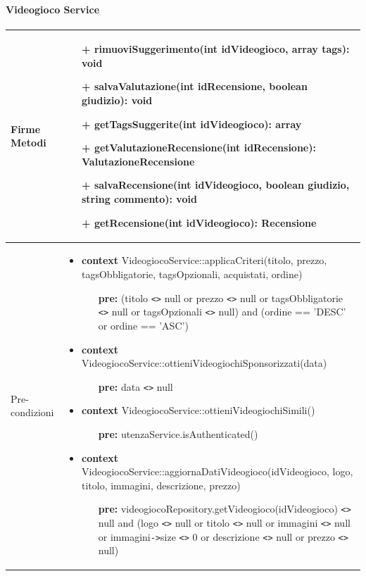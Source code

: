 \paragraph{Videogioco Service}
\small\begin{tabular}{|| l | p{28em} ||} 
	\hline
	Firme Metodi & \begin{itemize}
		\item[+] rimuoviSuggerimento(int idVideogioco, array tags): void
		\item[+] salvaValutazione(int idRecensione, boolean giudizio): void
		\item[+] getTagsSuggerite(int idVideogioco): array
		\item[+] getValutazioneRecensione(int idRecensione): ValutazioneRecensione
		\item[+] salvaRecensione(int idVideogioco, boolean giudizio, string commento): void
		\item[+] getRecensione(int idVideogioco): Recensione
	\end{itemize}\\
	\hline
	Pre-condizioni & \begin{itemize}[leftmargin=*]
		\item \textbf{context} VideogiocoService::applicaCriteri(titolo, prezzo, tagsObbligatorie, tagsOpzionali, acquistati, ordine)
		\begin{itemize}
			\item[ ] \textbf{pre:} (titolo \verb|<>| null or prezzo \verb|<>| null or tagsObbligatorie \verb|<>| null or tagsOpzionali \verb|<>| null) and (ordine == 'DESC' or ordine == 'ASC')
		\end{itemize}

		\item \textbf{context} VideogiocoService::\newline ottieniVideogiochiSponsorizzati(data)
		\begin{itemize}
			\item[ ] \textbf{pre:} data \verb|<>| null
		\end{itemize}

		\item \textbf{context} VideogiocoService::ottieniVideogiochiSimili()
		\begin{itemize}
			\item[ ] \textbf{pre:} utenzaService.isAuthenticated()
		\end{itemize}

		\item \textbf{context} VideogiocoService::\newline aggiornaDatiVideogioco(idVideogioco, logo, titolo, immagini, descrizione, prezzo)
		\begin{itemize}
			\item[ ] \textbf{pre:} videogiocoRepository.getVideogioco(idVideogioco) \verb|<>| null and (logo \verb|<>| null or titolo \verb|<>| null or immagini \verb|<>| null or immagini\verb|->|size \verb|<>| 0 or descrizione \verb|<>| null or prezzo \verb|<>| null)
		\end{itemize}


\end{itemize}
\end{tabular}
